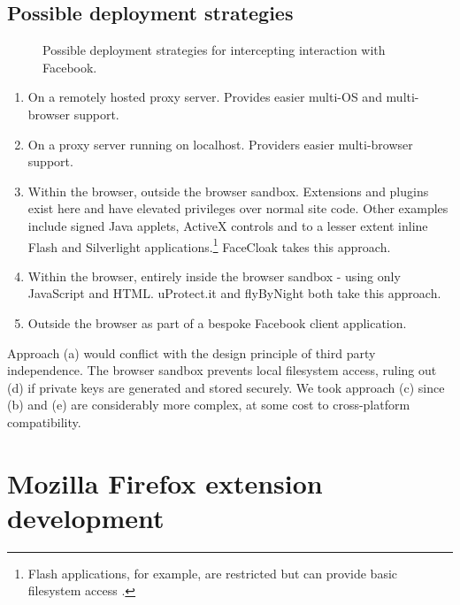 \subsection{Possible deployment strategies}

\begin{figure}[tb]
\begin{center}
    
\caption{Possible deployment strategies for intercepting interaction with Facebook.}
\label{fig:approaches}
\end{center}
\end{figure}


\begin{enumerate}
\renewcommand{\labelenumi}{\alph{enumi})}
    
    \item On a remotely hosted proxy server. Provides easier multi-OS and multi-browser support.
    
    \item On a proxy server running on localhost. Providers easier multi-browser support.
    
    \item Within the browser, outside the browser sandbox. Extensions and plugins exist here and have elevated privileges over normal site code. Other examples include signed Java applets, ActiveX controls and to a lesser extent inline Flash and Silverlight applications.\footnote{Flash applications, for example, are restricted but can provide basic filesystem access \cite{flash-sbox}.} FaceCloak takes this approach.
    
    \item Within the browser, entirely inside the browser sandbox - using only JavaScript and HTML. uProtect.it and flyByNight both take this approach.
    
    \item Outside the browser as part of a bespoke Facebook client application.
    
\end{enumerate}
   
Approach (a) would conflict with the design principle of third party independence. The browser sandbox prevents local filesystem access, ruling out (d) if private keys are generated and stored securely. We took approach (c) since (b) and (e) are considerably more complex, at some cost to cross-platform compatibility.



\FloatBarrier
\section{Mozilla Firefox extension development}

